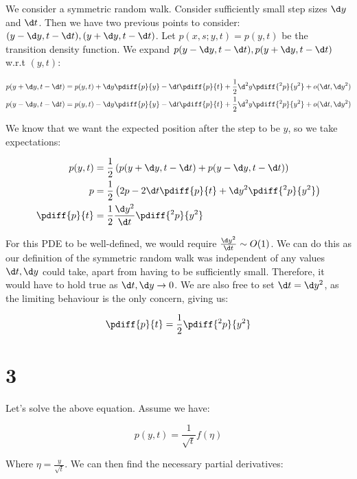 \documentclass{article}
\begin{document}
	We consider a symmetric random walk. Consider sufficiently small step sizes $\d y$ and $\d t$. Then we have two previous points to consider: $(y - \d y, t - \d t), (y + \d y, t - \d t)$. Let $p(x,s;y,t) = p(y,t) $ be the transition density function. We expand $p(y - \d y, t - \d t), p(y + \d y, t - \d t)$ w.r.t $(y,t)$:
	
	\begin{align*}
		p(y + \d y, t - \d t) &= p(y,t) + \d y \pdiff{p}{y} - \d t \pdiff{p}{t} + \frac{1}{2}\d^2 y \pdiff{^2p}{y^2} + o(\d t, \d y^2)\\
		p(y - \d y, t - \d t) &= p(y,t) - \d y \pdiff{p}{y} - \d t \pdiff{p}{t} + \frac{1}{2}\d^2 y \pdiff{^2p}{y^2} + o(\d t, \d y^2)
	\end{align*}
	
	We know that we want the expected position after the step to be $y$, so we take expectations:
	
	\begin{align*}
		p(y,t) &= \frac{1}{2}\left(p(y + \d y, t - \d t) + p(y - \d y, t - \d t) \right) \\
		p &= \frac{1}{2}\left(2p - 2 \d t \pdiff{p}{t} + \d y^2 \pdiff{^2 p}{y^2}\right) \\
		\pdiff{p}{t} &= \frac{1}{2} \frac{\d y^2}{\d t} \pdiff{^2 p}{y^2}
	\end{align*}
	
	For this PDE to be well-defined, we would require $\frac{\d y^2}{\d t} \sim O(1)$. We can do this as our definition of the symmetric random walk was independent of any values $\d t, \d y$ could take, apart from having to be sufficiently small. Therefore, it would have to hold true as $\d t, \d y \rightarrow 0$. We are also free to set $\d t = \d y^2$, as the limiting behaviour is the only concern, giving us:
	
	\begin{equation*}
		\pdiff{p}{t} = \frac{1}{2} \pdiff{^2 p}{y^2}
	\end{equation*}
	
	\section*{3}
	
	Let's solve the above equation. Assume we have:
	
	\begin{equation*}
		p(y,t) = \frac{1}{\sqrt{t}} f(\eta)
	\end{equation*}
	
	Where $\eta = \frac{y}{\sqrt{t}}$. We can then find the necessary partial derivatives:
	
\end{document}
